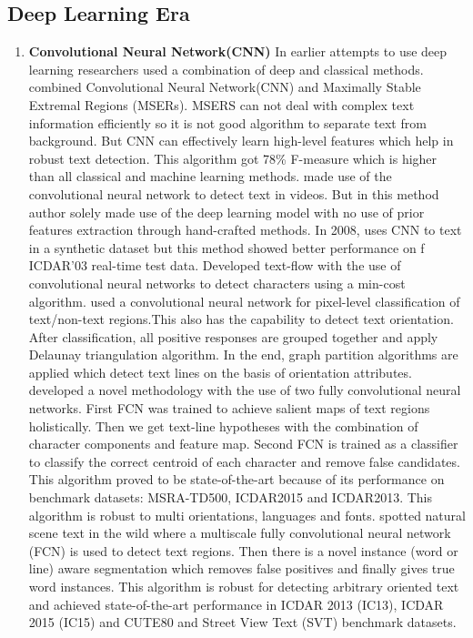 \subsection{Deep Learning Era}
\begin{enumerate}
    \item \textbf{Convolutional Neural Network(CNN)}  \newline
In earlier attempts to use deep learning researchers used a combination of deep and classical methods.\cite{CNN_MSER} combined Convolutional Neural Network(CNN) and Maximally Stable Extremal Regions (MSERs). MSERS can not deal with complex text information efficiently so it is not good algorithm to separate text from background. But CNN can effectively learn high-level features which help in robust text detection. This algorithm got 78\% F-measure which is higher than all classical and machine learning methods. \cite{arabic}made use of the convolutional neural network to detect text in videos. But in this method author solely made use of the deep learning model with no use of prior features extraction through hand-crafted methods. In 2008, \cite{CNN} uses CNN to text in a synthetic dataset but this method showed better performance on f ICDAR’03 real-time test data.\cite{text-flow} Developed text-flow with the use of convolutional neural networks to detect characters using a min-cost algorithm.
\cite{yao2016scene} used a convolutional neural network for pixel-level classification of text/non-text regions.This also has the capability to detect text orientation. After classification, all positive responses are grouped together and apply Delaunay triangulation algorithm\cite{Kang2014OrientationRT}. In the end, graph partition algorithms are applied which detect text lines on the basis of orientation attributes.\cite{FullyCNN} developed a novel methodology with the use of two fully convolutional neural networks. First FCN was trained to achieve salient maps of text regions holistically. Then we get text-line hypotheses with the combination of character components and feature map. Second FCN is trained as a classifier to classify the correct centroid of each character and remove false candidates. This algorithm proved to be state-of-the-art because of its performance on benchmark datasets: MSRA-TD500, ICDAR2015 and ICDAR2013. This algorithm is robust to multi orientations, languages and fonts. \cite{segmentation-CNN} spotted natural scene text in the wild where a multiscale fully convolutional neural network (FCN) is used to detect text regions. Then there is a novel instance (word or line) aware segmentation which removes false positives and finally gives true word instances. This algorithm is robust for detecting arbitrary oriented text and achieved state-of-the-art performance in ICDAR 2013 (IC13), ICDAR 2015 (IC15) and CUTE80 and Street View Text (SVT) benchmark datasets.
\end{enumerate}

